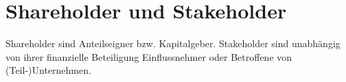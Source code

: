 \section{Shareholder und Stakeholder}

Shareholder sind Anteilseigner bzw. Kapitalgeber. Stakeholder sind unabhängig von ihrer finanzielle Beteiligung Einflussnehmer oder Betroffene von (Teil-)Unternehmen.